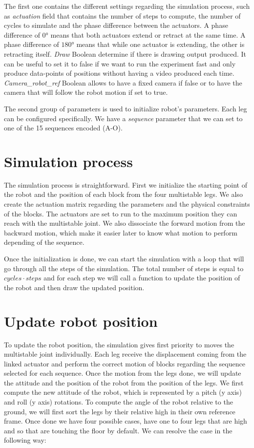        The first one contains the different settings regarding the simulation process, such as \textit{actuation} field that contains the number of steps to compute, the number of cycles to simulate and the phase difference between the actuators. A phase difference of $0$° means that both actuators extend or retract at the same time. A phase difference of $180$° means that while one actuator is extending, the other is retracting itself. \textit{Draw} Boolean determine if there is drawing output produced. It can be useful to set it to false if we want to run the experiment fast and only produce data-points of positions without having a video produced each time. \textit{Camera\_robot\_ref} Boolean allows to have a fixed camera if false or to have the camera that will follow the robot motion if set to true.
        
        The second group of parameters is used to initialize robot's parameters. Each leg can be configured specifically. We have a \textit{sequence} parameter that we can set to one of the 15 sequences encoded (A-O). 
        
    \section{Simulation process}
        The simulation process is straightforward. First we initialize the starting point of the robot and the position of each block from the four multistable legs. We also create the actuation matrix regarding the parameters and the physical constraints of the blocks. The actuators are set to run to the maximum position they can reach with the multistable joint. We also dissociate the forward motion from the backward motion, which make it easier later to know what motion to perform depending of the sequence.
        
        Once the initialization is done, we can start the simulation with a loop that will go through all the steps of the simulation. The total number of steps is equal to $cycles \cdot steps$ and for each step we will call a function to update the position of the robot and then draw the updated position. 
        
    \section{Update robot position}
        To update the robot position, the simulation gives first priority to moves the multistable joint individually. Each leg receive the displacement coming from the linked actuator and perform the correct motion of blocks regarding the sequence selected for each sequence. Once the motion from the legs done, we will update the attitude and the position of the robot from the position of the legs.
        We first compute the new attitude of the robot, which is represented by a pitch (y axis) and roll (y axis) rotations. To compute the angle of the robot relative to the ground, we will first sort the legs by their relative high in their own reference frame. Once done we have four possible cases, have one to four legs that are high and so that are touching the floor by default. We can resolve the case in the following way:
